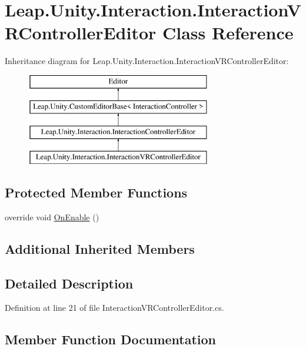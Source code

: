 \hypertarget{class_leap_1_1_unity_1_1_interaction_1_1_interaction_v_r_controller_editor}{}\section{Leap.\+Unity.\+Interaction.\+Interaction\+V\+R\+Controller\+Editor Class Reference}
\label{class_leap_1_1_unity_1_1_interaction_1_1_interaction_v_r_controller_editor}
Inheritance diagram for Leap.\+Unity.\+Interaction.\+Interaction\+V\+R\+Controller\+Editor\+:\begin{figure}[H]
\begin{center}
\leavevmode
\includegraphics[height=4.000000cm]{class_leap_1_1_unity_1_1_interaction_1_1_interaction_v_r_controller_editor}
\end{center}
\end{figure}
\subsection*{Protected Member Functions}
\begin{DoxyCompactItemize}
\item 
override void \mbox{\hyperlink{class_leap_1_1_unity_1_1_interaction_1_1_interaction_v_r_controller_editor_a0f59ab3b008018e73fe47191667c07f2}{On\+Enable}} ()
\end{DoxyCompactItemize}
\subsection*{Additional Inherited Members}


\subsection{Detailed Description}


Definition at line 21 of file Interaction\+V\+R\+Controller\+Editor.\+cs.



\subsection{Member Function Documentation}
\mbox{\label{class_leap_1_1_unity_1_1_interaction_1_1_interaction_v_r_controller_editor_a0f59ab3b008018e73fe47191667c07f2}} 
